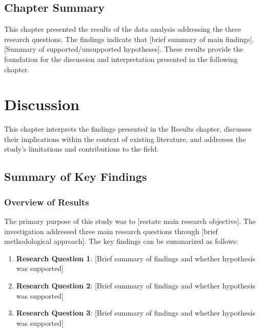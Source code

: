 \documentclass[
  12pt,
  letterpaper,
  12pt,
  letterpaper,
  oneside]{report}
\providecommand{\tightlist}{%
  \setlength{\itemsep}{0pt}\setlength{\parskip}{0pt}}
\begin{document}
\section{Chapter Summary}\label{chapter-summary-2}

This chapter presented the results of the data analysis addressing the
three research questions. The findings indicate that {[}brief summary of
main findings{]}. {[}Summary of supported/unsupported hypotheses{]}.
These results provide the foundation for the discussion and
interpretation presented in the following chapter.


\chapter{Discussion}\label{discussion}

This chapter interprets the findings presented in the Results chapter,
discusses their implications within the context of existing literature,
and addresses the study's limitations and contributions to the field.

\section{Summary of Key Findings}\label{summary-of-key-findings}

\subsection{Overview of Results}\label{overview-of-results}

The primary purpose of this study was to {[}restate main research
objective{]}. The investigation addressed three main research questions
through {[}brief methodological approach{]}. The key findings can be
summarized as follows:

\begin{enumerate}
\def\labelenumi{\arabic{enumi}.}
\tightlist
\item
  \textbf{Research Question 1}: {[}Brief summary of findings and whether
  hypothesis was supported{]}
\item
  \textbf{Research Question 2}: {[}Brief summary of findings and whether
  hypothesis was supported{]}
\item
  \textbf{Research Question 3}: {[}Brief summary of findings and whether
  hypothesis was supported{]}
\end{enumerate}
\end{document}
